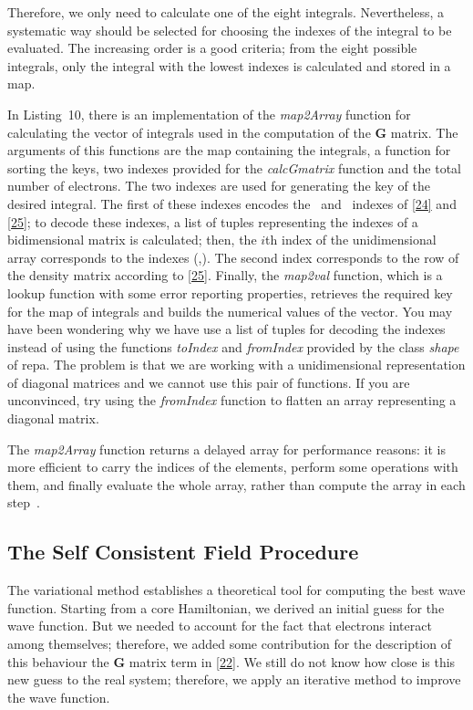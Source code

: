 \documentclass{tmr}
\begin{document}
Therefore, we only need to calculate one of the eight integrals. Nevertheless, a systematic
way should be selected for choosing the indexes of the integral to be
evaluated. The increasing order is a good criteria; from the eight possible integrals,
only the integral with the lowest indexes is calculated and stored in a map. 

In Listing~10, there is an implementation of the \textit{map2Array} function for
calculating the vector of integrals used in the computation of the \textbf{G} matrix. The
arguments of this functions are the map containing the integrals, a function 
for sorting the keys, two indexes provided for the \textit{calcGmatrix} function
and the total number of electrons. The two indexes are used for generating
the key of the desired integral. The first of these indexes encodes the \textalpha\ and 
\textbeta\ indexes of \eqref{24} and \eqref{25}; to decode these indexes, a list
of tuples representing the indexes of a bidimensional matrix is calculated;
then, the $i$th index of the unidimensional array corresponds to the indexes (\textalpha,\textbeta).
The second index corresponds to the row of the density matrix according to \eqref{25}. Finally,
the \textit{map2val} function, which is a lookup function with some error reporting properties, 
retrieves the required key for the map of integrals and builds the numerical values of the vector.
You may have been wondering why we have use a list of tuples for decoding 
the indexes instead of using the functions \textit{toIndex} and \textit{fromIndex}
provided by the class \textit{shape} of repa. The problem is that we are working with a
unidimensional representation of diagonal matrices and we cannot use this pair of functions.
If you are unconvinced, try using the \textit{fromIndex} function to flatten an array representing
a diagonal matrix.

The \textit{map2Array} function returns a delayed array for performance reasons: it is more efficient
to carry the indices of the elements, perform some operations with them, and finally
evaluate the whole array, rather than compute the array in each step~\cite{fusion}.

\subsection{The Self Consistent Field Procedure}

The variational method establishes a theoretical tool for computing the best
wave function. Starting from a core Hamiltonian, we derived an initial guess
for the wave function. But we needed to account for the fact that electrons interact among themselves;
therefore, we added some contribution for the description of this behaviour
the \textbf{G} matrix term in \eqref{22}. We still do not know how
close is this new guess to the real system; therefore, we apply an iterative method
to improve the wave function.
\end{document}
